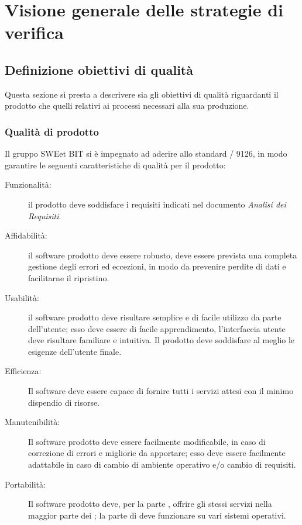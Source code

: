 \section{Visione generale delle strategie di verifica}
  \subsection{Definizione obiettivi di qualità}
  Questa sezione si presta a descrivere sia gli obiettivi di qualità riguardanti il prodotto
  che quelli relativi ai processi necessari alla sua produzione.
    \subsubsection{Qualità di prodotto}
    Il gruppo SWEet BIT si è impegnato ad aderire allo standard / 9126, in modo garantire
    le seguenti caratteristiche di qualità per il prodotto:
    \begin{description}
      \item [Funzionalità:] il prodotto deve soddisfare i requisiti indicati nel documento \emph{Analisi dei Requisiti}.

      \item [Affidabilità:] il software prodotto deve essere robusto, deve essere prevista una completa gestione degli errori ed eccezioni,
       in modo da prevenire perdite di dati e facilitarne il ripristino.

      \item [Usabilità:] il software prodotto deve risultare semplice e di facile utilizzo da parte dell'utente; esso deve essere di facile apprendimento,
      l'interfaccia utente deve risultare familiare e intuitiva. Il prodotto deve soddisfare al meglio le esigenze dell'utente finale.

      \item [Efficienza:] Il software deve essere capace di fornire tutti i servizi attesi con il minimo dispendio di risorse.

      \item [Manutenibilità:] Il software prodotto deve essere facilmente modificabile, in caso di correzione di errori e migliorie da apportare; esso deve essere facilmente
      adattabile in caso di cambio di ambiente operativo e/o cambio di requisiti.

      \item [Portabilità:] Il software prodotto deve, per la parte , offrire gli stessi servizi nella maggior parte dei ;
      la parte di  deve funzionare su vari sistemi operativi.
    \end{description}

